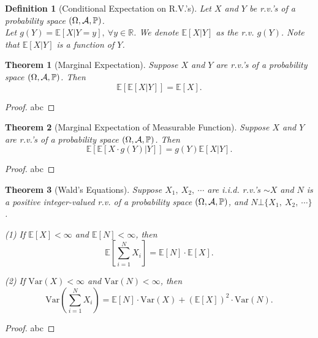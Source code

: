 \documentclass[openany,12pt]{book}
\newtheorem{theorem}{Theorem}[chapter]
\newtheorem{definition}{Definition}[chapter]
\begin{document}
\begin{definition}[Conditional Expectation on R.V.'s]
Let $X$ and $Y$ be r.v.'s of a probability space $(\Omega,\mathcal{A},\mathbb{P})$.\\
 Let $g(Y) = \mathbb{E}[X | Y = y],\ \forall y\mathbb{\in R}$. We denote $\mathbb{E}[ X|Y]$ as the r.v. $g(Y)$. Note that $\mathbb{E}[ X|Y]$ is a function of $Y$.
\end{definition}

\begin{theorem}[Marginal Expectation]
Suppose $X$ and $Y$ are r.v.'s of a probability space $(\Omega,\mathcal{A},\mathbb{P})$. Then
\[\mathbb{E}\left[ \mathbb{E}\left[ X | Y \right] \right] = \mathbb{E}[X].\]
\vspace{0.01cm}
\end{theorem}

\begin{proof}
  abc
\end{proof}

\begin{theorem}[Marginal Expectation of Measurable Function]
Suppose $X$ and $Y$ are r.v.'s of a probability space $(\Omega,\mathcal{A},\mathbb{P})$. Then
\[\mathbb{E}\left[ \mathbb{E}\left[ X \cdot g(Y) | Y \right] \right] = g( Y )\mathbb{E}\left[ X|Y \right].\]
\vspace{0.01cm}
\end{theorem}

\begin{proof}
  abc
\end{proof}

\begin{theorem}[Wald's Equations]
Suppose $X_{1},\ X_{2},\ \cdots$ are i.i.d. r.v.'s $\sim X$ and $N$
is a positive integer-valued r.v. of a probability space $(\Omega,\mathcal{A},\mathbb{P})$, and $N\bot\{ X_{1},\ X_{2},\ \cdots\}$.

(1) If $\mathbb{E}[X] < \infty$ and
$\mathbb{E}\left[ N \right] < \infty$, then
\[\mathbb{E}\left[ \sum_{i = 1}^{N}X_{i} \right] = \mathbb{E}\left[ N \right] \cdot \mathbb{E}[X].\]

(2) If $\mathrm{Var}(X) < \infty$ and $\mathrm{Var}(N) < \infty$, then
\[\mathrm{Var}\left( \sum_{i = 1}^{N}X_{i} \right) = \mathbb{E}[N] \cdot \mathrm{Var}(X) + \left( \mathbb{E}[X] \right)^{2} \cdot \mathrm{Var}(N).\]
\end{theorem}

\begin{proof}
  abc
\end{proof}
\end{document}
